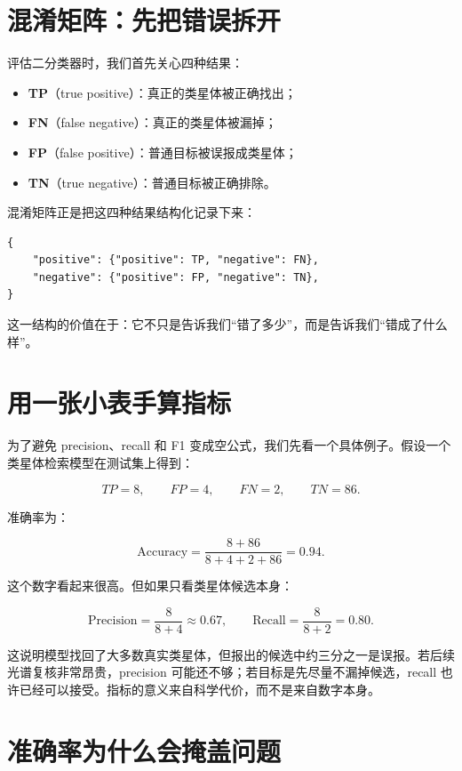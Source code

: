 \section{混淆矩阵：先把错误拆开}

评估二分类器时，我们首先关心四种结果：

\begin{itemize}
    \item \textbf{TP}（true positive）：真正的类星体被正确找出；
    \item \textbf{FN}（false negative）：真正的类星体被漏掉；
    \item \textbf{FP}（false positive）：普通目标被误报成类星体；
    \item \textbf{TN}（true negative）：普通目标被正确排除。
\end{itemize}

混淆矩阵正是把这四种结果结构化记录下来：

\begin{examplebox}[二分类混淆矩阵]
\begin{lstlisting}[style=pythonstyle]
{
    "positive": {"positive": TP, "negative": FN},
    "negative": {"positive": FP, "negative": TN},
}
\end{lstlisting}
\end{examplebox}

这一结构的价值在于：它不只是告诉我们“错了多少”，而是告诉我们“错成了什么样”。

\section{用一张小表手算指标}

为了避免 precision、recall 和 F1 变成空公式，我们先看一个具体例子。假设一个类星体检索模型在测试集上得到：

\[
TP=8,\qquad FP=4,\qquad FN=2,\qquad TN=86.
\]

准确率为：

\[
\mathrm{Accuracy}=\frac{8+86}{8+4+2+86}=0.94.
\]

这个数字看起来很高。但如果只看类星体候选本身：

\[
\mathrm{Precision}=\frac{8}{8+4}\approx 0.67,
\qquad
\mathrm{Recall}=\frac{8}{8+2}=0.80.
\]

这说明模型找回了大多数真实类星体，但报出的候选中约三分之一是误报。若后续光谱复核非常昂贵，precision 可能还不够；若目标是先尽量不漏掉候选，recall 也许已经可以接受。指标的意义来自科学代价，而不是来自数字本身。

\section{准确率为什么会掩盖问题}

